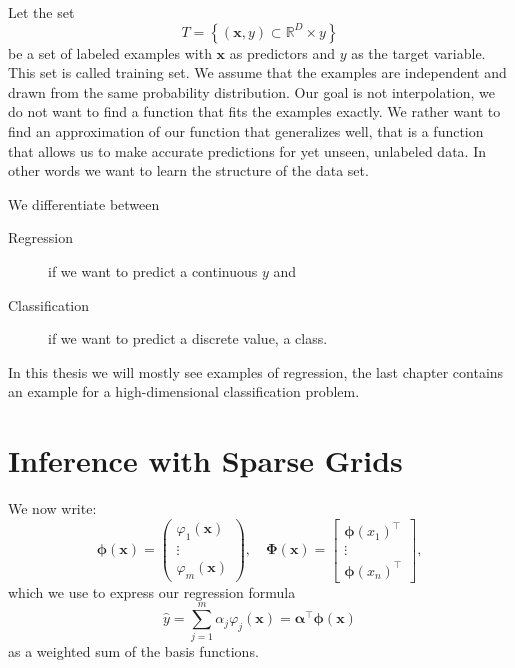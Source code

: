 Let the set 
\begin{equation*}
T = \left\{ \left(  \bm{x}, y \right) \subset \mathbb{R}^D \times y \right\} 
\end{equation*}
be a set of labeled examples with \(\bm{x}\) as predictors and \(y\) as the
target variable. 
This set is called training set.
We assume that the examples are independent and drawn from the same probability distribution.
Our goal is not interpolation, we do not want to find a function that fits the
examples exactly.
We rather want to find an approximation of our function that
generalizes well, that is a function that allows us to make accurate predictions
for yet unseen, unlabeled data.
In other words we want to learn the structure of the data set.

We differentiate between
\begin{description}
\item[Regression] if we want to predict a continuous \(y\) and
\item[Classification] if we want to predict a discrete value, a class.
\end{description}
In this thesis we will mostly see examples of regression, the last chapter
contains an example for a high-dimensional classification problem.

\section{Inference with Sparse Grids}
We now write:
\begin{equation*}
\boldsymbol{\phi}(\boldsymbol{x}) = \begin{pmatrix}
  \varphi_1(\bm{x}) \\
  \vdots \\
  \varphi_m(\bm{x})
\end{pmatrix}
, \quad
\boldsymbol{\Phi}(\boldsymbol{x}) = \begin{bmatrix}
  \boldsymbol{\phi}(x_1)^\intercal\\
  \vdots \\
  \boldsymbol{\phi}(x_n)^\intercal
\end{bmatrix},
\end{equation*}
which we use to express our regression formula
\begin{equation*}
\hat{y} = \sum_{j = 1}^m \alpha_j \varphi_{j}(\bm{x}) = \boldsymbol{\alpha}^\intercal \bm{\phi} (\bm{x})
\end{equation*}
as a weighted sum of the basis functions.


